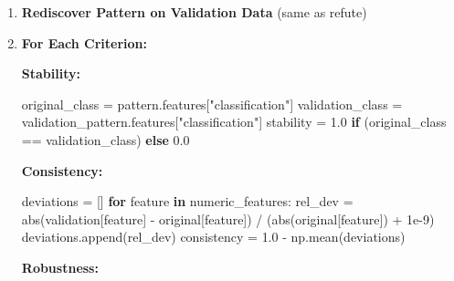 \documentclass[
]{article}
\newenvironment{Shaded}{}{}
\newcommand{\BuiltInTok}[1]{\textcolor[rgb]{0.00,0.50,0.00}{#1}}
\newcommand{\ControlFlowTok}[1]{\textcolor[rgb]{0.00,0.44,0.13}{\textbf{#1}}}
\newcommand{\FloatTok}[1]{\textcolor[rgb]{0.25,0.63,0.44}{#1}}
\newcommand{\KeywordTok}[1]{\textcolor[rgb]{0.00,0.44,0.13}{\textbf{#1}}}
\newcommand{\NormalTok}[1]{#1}
\newcommand{\OperatorTok}[1]{\textcolor[rgb]{0.40,0.40,0.40}{#1}}
\newcommand{\StringTok}[1]{\textcolor[rgb]{0.25,0.44,0.63}{#1}}
\begin{document}
\begin{enumerate}
\def\labelenumi{\arabic{enumi}.}
\item
  \textbf{Rediscover Pattern on Validation Data} (same as refute)
\item
  \textbf{For Each Criterion:}

  \textbf{Stability:}

\begin{Shaded}
\begin{Highlighting}[]
\NormalTok{original\_class }\OperatorTok{=}\NormalTok{ pattern.features[}\StringTok{"classification"}\NormalTok{]}
\NormalTok{validation\_class }\OperatorTok{=}\NormalTok{ validation\_pattern.features[}\StringTok{"classification"}\NormalTok{]}
\NormalTok{stability }\OperatorTok{=} \FloatTok{1.0} \ControlFlowTok{if}\NormalTok{ (original\_class }\OperatorTok{==}\NormalTok{ validation\_class) }\ControlFlowTok{else} \FloatTok{0.0}
\end{Highlighting}
\end{Shaded}

  \textbf{Consistency:}

\begin{Shaded}
\begin{Highlighting}[]
\NormalTok{deviations }\OperatorTok{=}\NormalTok{ []}
\ControlFlowTok{for}\NormalTok{ feature }\KeywordTok{in}\NormalTok{ numeric\_features:}
\NormalTok{    rel\_dev }\OperatorTok{=} \BuiltInTok{abs}\NormalTok{(validation[feature] }\OperatorTok{{-}}\NormalTok{ original[feature]) }\OperatorTok{/}\NormalTok{ (}\BuiltInTok{abs}\NormalTok{(original[feature]) }\OperatorTok{+} \FloatTok{1e{-}9}\NormalTok{)}
\NormalTok{    deviations.append(rel\_dev)}
\NormalTok{consistency }\OperatorTok{=} \FloatTok{1.0} \OperatorTok{{-}}\NormalTok{ np.mean(deviations)}
\end{Highlighting}
\end{Shaded}

  \textbf{Robustness:}


\end{enumerate}
\end{document}
